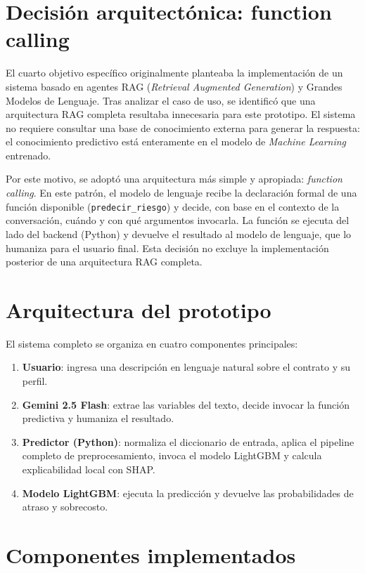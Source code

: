 \documentclass[12pt,letterpaper,oneside]{report}
\begin{document}
\section{Decisión arquitectónica: function calling}

El cuarto objetivo específico originalmente planteaba la implementación de un
sistema basado en agentes RAG (\emph{Retrieval Augmented Generation}) y
Grandes Modelos de Lenguaje. Tras analizar el caso de uso, se identificó que
una arquitectura RAG completa resultaba innecesaria para este prototipo. El
sistema no requiere consultar una base de conocimiento externa para generar
la respuesta: el conocimiento predictivo está enteramente en el modelo de
\emph{Machine Learning} entrenado.

Por este motivo, se adoptó una arquitectura más simple y apropiada:
\emph{function calling}. En este patrón, el modelo de lenguaje recibe la
declaración formal de una función disponible (\texttt{predecir\_riesgo}) y
decide, con base en el contexto de la conversación, cuándo y con qué
argumentos invocarla. La función se ejecuta del lado del backend (Python) y
devuelve el resultado al modelo de lenguaje, que lo humaniza para el usuario
final. Esta decisión no excluye la implementación posterior de una
arquitectura RAG completa.

\section{Arquitectura del prototipo}

El sistema completo se organiza en cuatro componentes principales:

\begin{enumerate}
    \item \textbf{Usuario}: ingresa una descripción en lenguaje natural sobre
    el contrato y su perfil.
    \item \textbf{Gemini 2.5 Flash}: extrae las variables del texto, decide
    invocar la función predictiva y humaniza el resultado.
    \item \textbf{Predictor (Python)}: normaliza el diccionario de entrada,
    aplica el pipeline completo de preprocesamiento, invoca el modelo
    LightGBM y calcula explicabilidad local con SHAP.
    \item \textbf{Modelo LightGBM}: ejecuta la predicción y devuelve las
    probabilidades de atraso y sobrecosto.
\end{enumerate}

\section{Componentes implementados}
\end{document}
